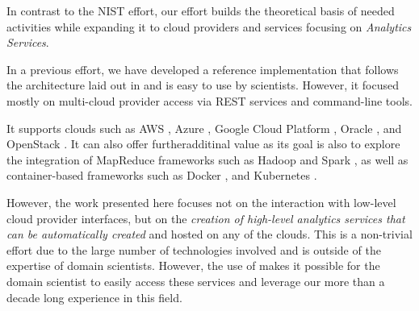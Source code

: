 
In contrast to the NIST effort, our
effort builds the theoretical basis of needed activities while
expanding it to cloud providers and services focusing on {\em
Analytics Services}. 

In a previous effort, we have developed a reference implementation
that follows the architecture laid out in  and is easy
to use by scientists.  However, it focused mostly on multi-cloud
provider access via REST services and command-line tools. 

It supports clouds such as
AWS \cite{www-aws}, Azure \cite{www-azure}, Google Cloud
Platform \cite{www-google}, Oracle \cite{www-oracle-cloud}, and
OpenStack \cite{www-openStack}. It can also offer furtheradditinal value as its goal is also to 
explore the integration of
MapReduce frameworks such as
Hadoop \cite{www-hadoop} and Spark \cite{www-spark}, as well as
container-based frameworks such as Docker \cite{www-docker}, and
Kubernetes \cite{www-kubernetes}.

However, the work presented here focuses not on the interaction with low-level
cloud provider interfaces, but on the {\em creation of high-level analytics services
that can be automatically created} and hosted on any of the
clouds.  This is a non-trivial
effort due to the large number of technologies involved and is outside
of the expertise of domain scientists. However, the use of \Cloudmesh
makes it possible for the domain scientist to easily access these
services and leverage our more than a decade long experience in this
field.


